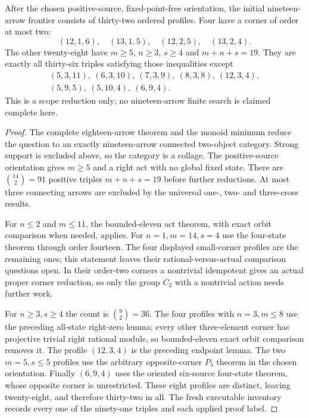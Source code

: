 \begin{proposition}
\label{CP2:A-two-object-nineteen-initial-scope}
After the chosen positive-source, fixed-point-free orientation,
the initial nineteen-arrow frontier consists of thirty-two ordered
profiles.  Four have a corner of order at most two:
\[
 (12,1,6),\quad(13,1,5),\quad(12,2,5),\quad(13,2,4).
\]
The other twenty-eight have $m\ge5$, $n\ge3$, $s\ge4$ and
$m+n+s=19$.  They are exactly all thirty-six triples satisfying
those inequalities except
\[
\begin{gathered}
 (5,3,11),\ (6,3,10),\ (7,3,9),\ (8,3,8),\ (12,3,4),\\
 (5,9,5),\ (5,10,4),\ (6,9,4).
\end{gathered}
\]
This is a scope reduction only; no nineteen-arrow finite search is
claimed complete here.
\end{proposition}
\begin{proof}
The complete eighteen-arrow theorem and the monoid minimum reduce
the question to an exactly nineteen-arrow connected two-object
category.  Strong support is excluded above, so the category is a
collage.  The positive-source orientation gives $m\ge5$ and a
right act with no global fixed state.  There are
$\binom{14}{2}=91$ positive triples $m+n+s=19$ before further
reductions.  At most three connecting arrows are excluded by the
universal one-, two- and three-cross results.

For $n\le2$ and $m\le11$, the bounded-eleven act theorem, with
exact orbit comparison when needed, applies.  For $n=1,m=14,s=4$
use the four-state theorem through order fourteen.  The four
displayed small-corner profiles are the remaining ones; this
statement leaves their rational-versus-actual comparison questions
open.  In their order-two corners a nontrivial idempotent gives an
actual proper corner reduction, so only the group $C_2$ with a
nontrivial action needs further work.

For $n\ge3,s\ge4$ the count is $\binom9{2}=36$.
The four profiles with $n=3,m\le8$ use the preceding all-state
right-zero lemma; every other three-element corner has projective
trivial right rational module, so bounded-eleven exact orbit
comparison removes it.  The profile $(12,3,4)$ is the preceding
endpoint lemma.  The two $m=5,s\le5$ profiles use the arbitrary
opposite-corner $P_5$ theorem in the chosen orientation.  Finally
$(6,9,4)$ uses the oriented six-source four-state theorem, whose
opposite corner is unrestricted.  These eight profiles are
distinct, leaving twenty-eight, and therefore thirty-two in all.
The fresh executable inventory records every one of the ninety-one
triples and each applied proof label.
\end{proof}

